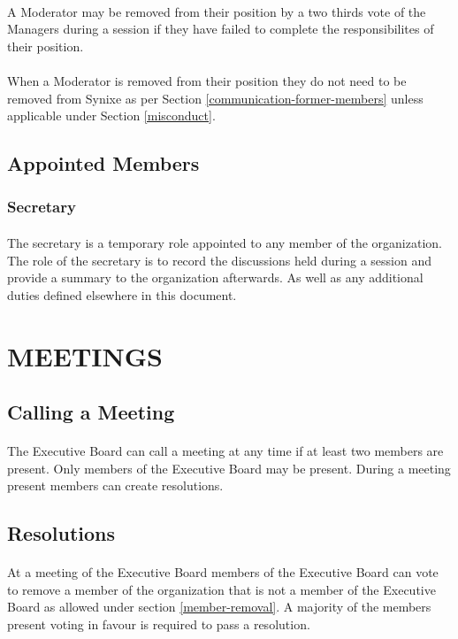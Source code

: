 \documentclass[10pt,a4paper]{article}
\begin{document}
\paragraph{}
A Moderator may be removed from their position by a two thirds vote of the Managers during a session if they have failed to complete the responsibilites of their position.
\paragraph{}
When a Moderator is removed from their position they do not need to be removed from Synixe as per Section \ref{communication-former-members} unless applicable under Section \ref{misconduct}.
\subsection{Appointed Members}
\subsubsection{Secretary}
\paragraph{}
The secretary is a temporary role appointed to any member of the organization. The role of the secretary is to record the discussions held during a session and provide a summary to the organization afterwards. As well as any additional duties defined elsewhere in this document.
\section{MEETINGS}
\subsection{Calling a Meeting}
\paragraph{}
The Executive Board can call a meeting at any time if at least two members are present. Only members of the Executive Board may be present. During a meeting present members can create resolutions.
\subsection{Resolutions}
\paragraph{}
At a meeting of the Executive Board members of the Executive Board can vote to remove a member of the organization that is not a member of the Executive Board as allowed under section \ref{member-removal}. A majority of the members present voting in favour is required to pass a resolution.
\end{document}
